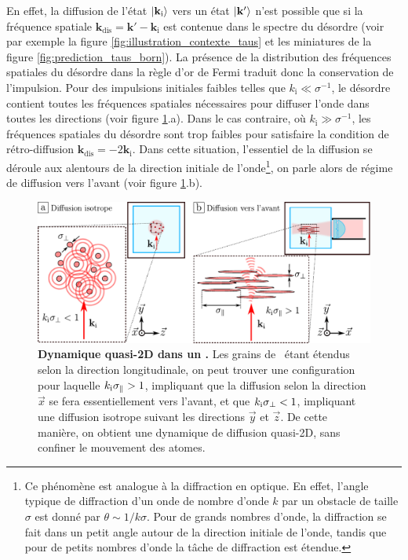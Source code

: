 En effet, la diffusion de l'état $\left| \mathbf{k}_{\mathrm{i}} \right\rangle$ vers un état $\left| \mathbf{k}' \right\rangle$ n'est possible que si la fréquence spatiale $\mathbf{k}_{\mathrm{dis}}=\mathbf{k}'-\mathbf{k}_{\mathrm{i}}$ est contenue dans le spectre du désordre (voir par exemple la figure \ref{fig:illustration_contexte_taus} et les miniatures de la figure \ref{fig:prediction_taus_born}). La présence de la distribution des fréquences spatiales du désordre dans la règle d'or de Fermi traduit donc la conservation de l'impulsion. Pour des impulsions initiales faibles telles que $k_{\mathrm{i}}\ll\sigma^{-1}$, le désordre contient toutes les fréquences spatiales nécessaires pour diffuser l'onde dans toutes les directions (voir figure \ref{fig:desordre_2D}.a). Dans le cas contraire, où $k_{\mathrm{i}}\gg\sigma^{-1}$, les fréquences spatiales du désordre sont trop faibles pour satisfaire la condition de rétro-diffusion $\mathbf{k}_{\mathrm{dis}}=-2 \mathbf{k}_{\mathrm{i}}$. Dans cette situation, l'essentiel de la diffusion se déroule aux alentours de la direction initiale de l'onde\footnote{Ce phénomène est analogue à la diffraction en optique. En effet, l'angle typique de diffraction d'un onde de nombre d'onde $k$ par un obstacle de taille $\sigma$ est donné par $\theta\sim 1/k\sigma$. Pour de grands nombres d'onde, la diffraction se fait dans un petit angle autour de la direction initiale de l'onde, tandis que pour de petits nombres d'onde la tâche de diffraction est étendue.}, on parle alors de régime de diffusion vers l'avant (voir figure \ref{fig:desordre_2D}.b). 

\begin{figure}
\centering
\includegraphics[width=\textwidth]{Fig/TauS_PRL/desordre_2D.pdf}
\caption{\textbf{Dynamique quasi-2D dans un \speckle .} Les grains de \speckle\ étant étendus selon la direction longitudinale, on peut trouver une configuration pour laquelle $k_{\mathrm{i}}\sigma_{\parallel}>1$, impliquant que la diffusion selon la direction $\vec{x}$ se fera essentiellement vers l'avant, et que $k_{\mathrm{i}}\sigma_{\perp}<1$, impliquant une diffusion isotrope suivant les directions $\vec{y}$ et $\vec{z}$. De cette manière, on obtient une dynamique de diffusion quasi-2D, sans confiner le mouvement des atomes.}
\label{fig:desordre_2D}
\end{figure}

